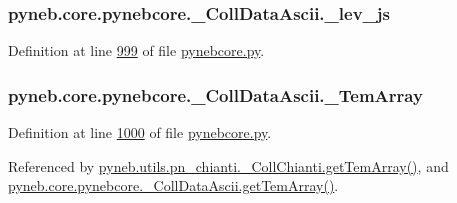 \hypertarget{classpyneb_1_1core_1_1pynebcore_1_1___coll_data_ascii_a8c077039b4837a27b71583f26dd858a8}{
\subsubsection[{\-\_\-lev\-\_\-js}]{\setlength{\rightskip}{0pt plus 5cm}pyneb.\-core.\-pynebcore.\-\_\-\-Coll\-Data\-Ascii.\-\_\-lev\-\_\-js\hspace{0.3cm}{\ttfamily [private]}}}\label{classpyneb_1_1core_1_1pynebcore_1_1___coll_data_ascii_a8c077039b4837a27b71583f26dd858a8}


Definition at line \hyperlink{pynebcore_8py_source_l00999}{999} of file \hyperlink{pynebcore_8py_source}{pynebcore.\-py}.

\hypertarget{classpyneb_1_1core_1_1pynebcore_1_1___coll_data_ascii_adb47c4cf2b9f3b82a281d0277e136693}{
\subsubsection[{\-\_\-\-Tem\-Array}]{\setlength{\rightskip}{0pt plus 5cm}pyneb.\-core.\-pynebcore.\-\_\-\-Coll\-Data\-Ascii.\-\_\-\-Tem\-Array\hspace{0.3cm}{\ttfamily [private]}}}\label{classpyneb_1_1core_1_1pynebcore_1_1___coll_data_ascii_adb47c4cf2b9f3b82a281d0277e136693}


Definition at line \hyperlink{pynebcore_8py_source_l01000}{1000} of file \hyperlink{pynebcore_8py_source}{pynebcore.\-py}.



Referenced by \hyperlink{pn__chianti_8py_source_l00551}{pyneb.\-utils.\-pn\-\_\-chianti.\-\_\-\-Coll\-Chianti.\-get\-Tem\-Array()}, and \hyperlink{pynebcore_8py_source_l01129}{pyneb.\-core.\-pynebcore.\-\_\-\-Coll\-Data\-Ascii.\-get\-Tem\-Array()}.

